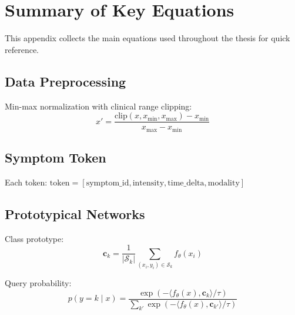 \chapter{Summary of Key Equations}
\label{app:equations}

This appendix collects the main equations used throughout the thesis for quick reference.

\section{Data Preprocessing}

Min-max normalization with clinical range clipping:
\begin{equation}
x' = \frac{\text{clip}(x, x_{\min}, x_{\max}) - x_{\min}}{x_{\max} - x_{\min}}
\end{equation}

\section{Symptom Token}

Each token: $\text{token} = [\text{symptom\_id}, \text{intensity}, \text{time\_delta}, \text{modality}]$

\section{Prototypical Networks}

Class prototype:
\begin{equation}
\mathbf{c}_k = \frac{1}{|\mathcal{S}_k|} \sum_{(x_i, y_i) \in \mathcal{S}_k} f_\theta(x_i)
\end{equation}

Query probability:
\begin{equation}
p(y = k \mid x) = \frac{\exp(-\langle f_\theta(x), \mathbf{c}_k \rangle / \tau)}{\sum_{k'} \exp(-\langle f_\theta(x), \mathbf{c}_{k'} \rangle / \tau)}
\end{equation}

